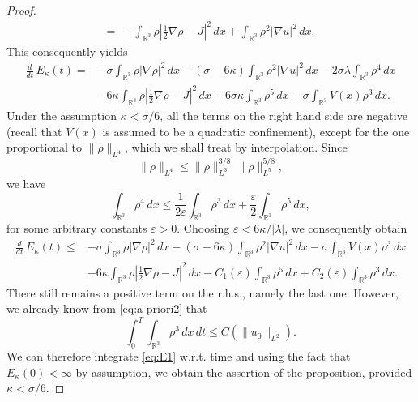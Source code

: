 \documentclass[a4paper,leqno]{amsart}
\theoremstyle{plain}
\theoremstyle{definition}
\numberwithin{equation}{section}
\begin{document}
\begin{proof}
\begin{align*}
=& -\int_{{{\mathbb R}}^3}\rho{\left|{{\frac{1}{2}}\nabla\rho-J}\right|}^2\, d x
+\int_{{{\mathbb R}}^3}\rho^2|\nabla u|^2\, d x.
\end{align*}
This consequently yields
\begin{equation} \label{eq:E}
\begin{split}
\frac{d}{dt} \, E_\kappa(t)
=&-\sigma\int_{{{\mathbb R}}^3}\rho|\nabla\rho|^2\, d x-(\sigma-6\kappa)\int_{{{\mathbb R}}^3}\rho^2|\nabla u|^2\, d x-2\sigma\lambda\int_{{{\mathbb R}}^3}\rho^4\, d x\\
&-6\kappa \int_{{{\mathbb R}}^3}\rho{\left|{{\frac{1}{2}}\nabla\rho-J}\right|}^2\, d x -6\sigma \kappa \int_{{{\mathbb R}}^3}\rho^5\, d x - \sigma \int_{{{\mathbb R}}^3} V(x) \rho^3 \, dx.
\end{split}
\end{equation}
Under the assumption $\kappa< \sigma /6$, all the terms on the right hand side are negative
(recall that $V(x)$ is assumed to be a quadratic confinement), except for the one
proportional to $\|\rho \|_{L^4}$, which we shall treat by interpolation. Since
\begin{equation*}
\|\rho\|_{L^4}{\leqslant}\|\rho\|_{L^3}^{3/8}\, \|\rho\|_{L^5}^{5/8},
\end{equation*}
we have
\begin{equation*}
\int_{{{\mathbb R}}^3}\rho^4 \, d x{\leqslant}{\frac{1}{{2{\varepsilon}}}}\int_{{{\mathbb R}}^3}\rho^3\, d x+\frac{\varepsilon}{2}\int_{{{\mathbb R}}^3}\rho^5\, d x,
\end{equation*}
for some arbitrary constants ${\varepsilon} >0$. Choosing ${\varepsilon} < 6 \kappa / |\lambda|$, we consequently obtain
\begin{equation} \label{eq:E1}
\begin{split}
\frac{d}{dt} \, E_\kappa(t)
{\leqslant} &-\sigma\int_{{{\mathbb R}}^3}\rho|\nabla\rho|^2\, d x-(\sigma-6\kappa)\int_{{{\mathbb R}}^3}\rho^2|\nabla u|^2\, d x - \sigma \int_{{{\mathbb R}}^3} V(x) \rho^3 \, dx\\
&-6\kappa \int_{{{\mathbb R}}^3}\rho{\left|{{\frac{1}{2}}\nabla\rho-J}\right|}^2\, d x -C_1({\varepsilon}) \int_{{{\mathbb R}}^3}\rho^5\, d x + C_2({\varepsilon}) \int_{{{\mathbb R}}^3}\rho^3\, d x.
\end{split}
\end{equation}
There still remains a positive term on the r.h.s., namely the last one. However, we already know from \eqref{eq:a-priori2} that
\begin{equation*}
\int_0^T\int_{{{\mathbb R}}^3}\rho^3\, d x \, d t{\leqslant} C (\| u_0 \|_{L^2}).
\end{equation*}
We can therefore integrate \eqref{eq:E1} w.r.t. time and using the fact that $E_\kappa(0)< \infty$ by assumption, we
obtain the assertion of the proposition, provided $\kappa< \sigma /6$.
\end{proof}
\end{document}
